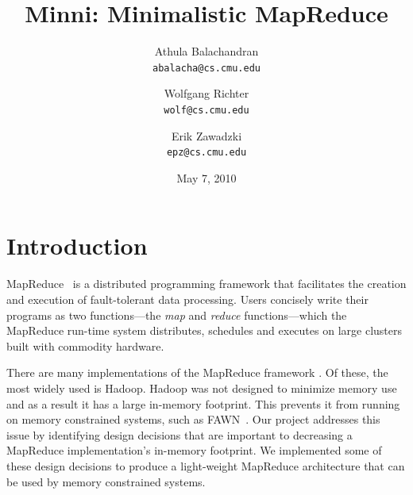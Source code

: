 \documentclass[10pt,letter,final,article,twocolumn]{article} %
\title{Minni: Minimalistic MapReduce}
\author{Athula Balachandran \\
{\tt abalacha@cs.cmu.edu}
\and
Wolfgang Richter \\
{\tt wolf@cs.cmu.edu}
\and
Erik Zawadzki \\
{\tt epz@cs.cmu.edu}}
\date{May 7, 2010} %
\begin{document}

\maketitle

\section{Introduction}
MapReduce~\citep{mapreduce08} is a distributed programming framework that facilitates the creation and execution of fault-tolerant data processing. Users concisely write their programs as two functions---the \emph{map} and \emph{reduce} functions---which the MapReduce run-time system distributes, schedules and executes on large clusters built with commodity hardware. 

There are many implementations of the MapReduce framework \citep{mochi,hadoop10,disco10,sphere09}. Of these, the most widely used is Hadoop. Hadoop was not designed to minimize memory use and as a result it has a large in-memory footprint. This prevents it from running on memory constrained systems, such as FAWN~\citep{fawn09}. Our project addresses this issue by identifying design decisions that are important to decreasing a MapReduce implementation's in-memory footprint. We implemented some of these design decisions to produce a light-weight MapReduce architecture that can be used by memory constrained systems.


\end{document}
